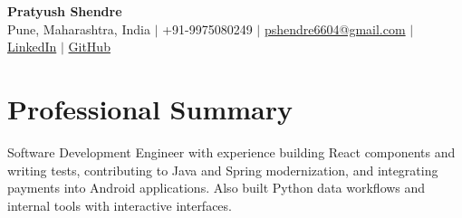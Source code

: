\documentclass[a4paper,11pt]{article}
\begin{document}
\begin{center}
  {\Large\bfseries Pratyush Shendre}\\[2pt]
  \small Pune, Maharashtra, India $|$ +91-9975080249 $|$
  \href{mailto:pshendre6604@gmail.com}{pshendre6604@gmail.com} $|$
  \href{https://linkedin.com/in/pratyush-shendre-2256a7223/}{LinkedIn} $|$
  \href{https://github.com/PratyushS04}{GitHub}
\end{center}

\section{Professional Summary}
\small Software Development Engineer with experience building React components and writing tests, contributing to Java and Spring modernization, and integrating payments into Android applications. Also built Python data workf{}lows and internal tools with interactive interfaces.
\end{document}
